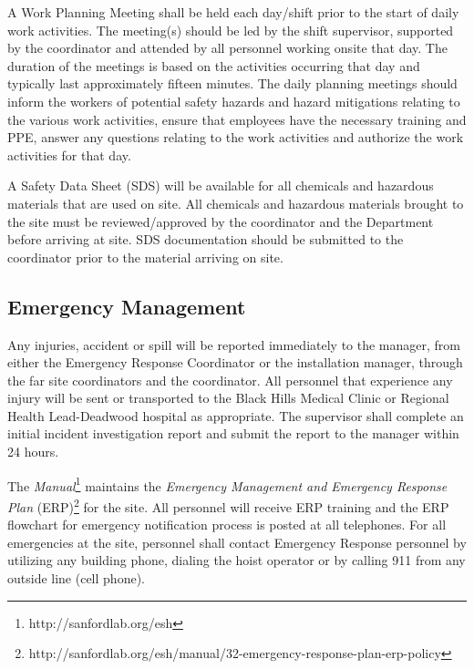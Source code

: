 A Work Planning Meeting shall be held each day/shift prior to the
start of daily work activities. The meeting(s) should be led by the
shift supervisor, supported by the   coordinator and
attended by all personnel working onsite that day. The duration of
the meetings is based on the activities occurring that day and
typically last approximately fifteen minutes. The daily planning
meetings should inform the workers of potential safety hazards and
hazard mitigations relating to the various work activities, ensure
that employees have the necessary  training and PPE, answer any
questions relating to the work activities and authorize the work
activities for that day.

A Safety Data Sheet (SDS) will be available for all chemicals and
hazardous materials that are used on site. All chemicals and hazardous
materials brought to the  site must be reviewed/approved by the
  coordinator and the  
Department before arriving at site.  SDS documentation should be
submitted to the   coordinator prior to the
material arriving on site.

\subsection{Emergency Management}

Any injuries, accident or spill will be reported immediately to the
  manager, from either the 
Emergency Response Coordinator or the installation manager, through the
 far site  coordinators and the 
 coordinator. All personnel that experience any injury will be
sent or transported to the Black Hills Medical Clinic or Regional Health
Lead-Deadwood hospital as appropriate.  The supervisor shall complete an
initial incident investigation report and submit the report to the
  manager within 24 hours.

The {\it {} 
Manual}\footnote{http://sanfordlab.org/esh} maintains the {\it Emergency
Management and Emergency Response Plan}
(ERP)\footnote{http://sanfordlab.org/esh/manual/32-emergency-response-plan-erp-policy}
for the site. All personnel will receive ERP training and the ERP
flowchart for emergency notification process is posted at all
telephones. For all emergencies at the  site, personnel
shall contact Emergency Response personnel by utilizing any building
phone, dialing the hoist operator or by calling 911 from any outside
line (cell phone).

